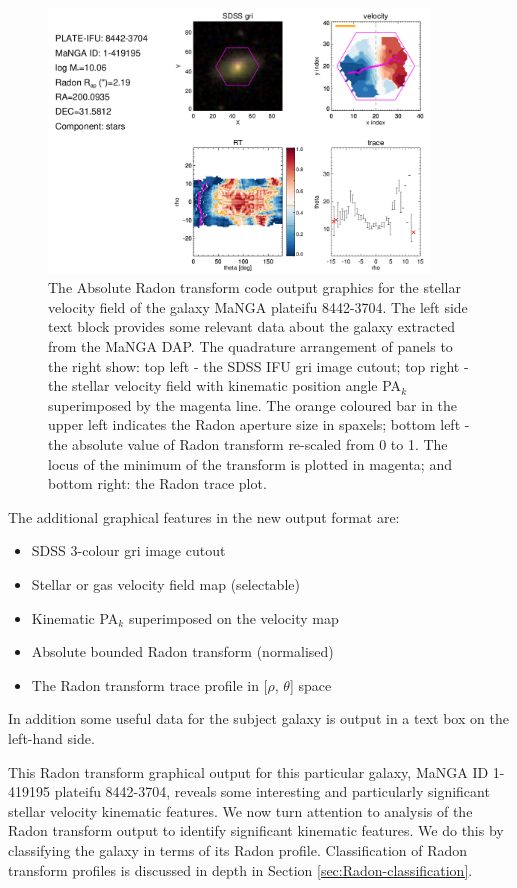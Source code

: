 \begin{figure}
    \centering
    \includegraphics[width=0.9\textwidth]{images/RadonPlots/RT-SNIPS-NEW/8442-3704-complete.png}
    \caption[Radon transform code output graphics for stellar velocity field of the MaNGA plateifu 8442-3704]{The Absolute Radon transform code output graphics for the stellar velocity field of the galaxy MaNGA plateifu 8442-3704. The left side text block provides some relevant data about the galaxy extracted from the MaNGA DAP. The quadrature arrangement of panels to the right show: top left - the SDSS IFU gri image cutout; top right - the stellar velocity field with kinematic position angle PA$_{k}$ superimposed by the magenta line. The orange coloured  bar in the upper left indicates the Radon aperture size in spaxels; bottom left - the absolute value of Radon transform re-scaled from 0 to 1. The locus of the minimum of the transform is plotted in magenta; and bottom right: the Radon trace plot.}
    \label{fig:8442-3704-complete}
\end{figure}

The additional graphical features in the new output format are:
\begin{itemize}
\item SDSS 3-colour gri image cutout
\item Stellar or gas velocity field map (selectable)
\item Kinematic PA$_{k}$ superimposed on the velocity map
\item Absolute bounded Radon transform (normalised)
\item The Radon transform trace profile in [$\rho$,	$\theta$] space
\end{itemize}
In addition some useful data for the subject galaxy is output in a text box on the left-hand side.

This Radon transform graphical output for this particular galaxy, MaNGA ID 1-419195 plateifu 8442-3704, reveals some interesting and particularly significant stellar velocity kinematic features. We now turn attention to analysis of the Radon transform output to identify significant kinematic features. We do this by classifying the galaxy in terms of its Radon profile. Classification of Radon transform profiles is discussed in depth in Section \ref{sec:Radon-classification}. 






